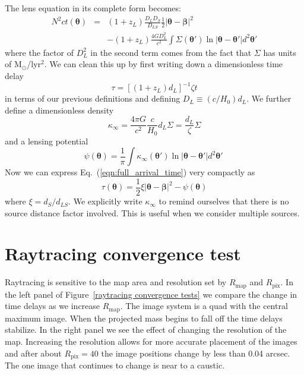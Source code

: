 \documentclass[galley,usenatbib]{mn2e}
\newcommand{\Rmap}{\ensuremath{R_\mathrm{map}}}
\newcommand{\Rpix}{\ensuremath{R_\mathrm{pix}}}
\newcommand{\Msun}{\ensuremath{\mathrm{M}_\odot}}
\newcommand{\figref}[1] {Figure~\ref{#1}}
\newcommand{\eqnref}[1] {Eq.~(\ref{#1})}
\renewcommand{\vec}[1]{\ensuremath{\boldsymbol{#1}}}
\begin{document}
The lens equation in its complete form becomes:
%
\begin{eqnarray}
N^2ct(\vec\theta) & = & (1+z_L)\frac{D_{L}D_{S}}{D_{LS}}\frac12 |\vec\theta - \vec\beta|^2 \nonumber \\
& & - (1+z_L)\frac{4GD_{L}^2}{c^2}\int \Sigma(\vec\theta') \ln |\vec\theta-\vec\theta'| d^2\vec\theta'
\label{eqn:full_arrival_time}
\end{eqnarray}
%
where the factor of $D_L^2$ in the second term comes from the fact that $\Sigma$
has units of \Msun/lyr$^2$. We can clean this up by first writing down a dimensionless time
delay
%
\begin{equation}
\tau = \left[ (1+z_L) d_L\right]^{-1}\zeta t
\label{tau}
\end{equation}
%
in terms of our previous definitions and defining $D_L \equiv (c/H_0)d_L$. We
further define a dimensionless density
%
\begin{equation}
\kappa_\infty = \frac{4\pi G}{c^2}\frac{c}{H_0}d_L\Sigma
              = \frac{d_L}{\zeta}\Sigma
\end{equation}
%
and a lensing potential
%
\begin{equation}
\psi(\vec\theta) = \frac1\pi \int \kappa_\infty(\vec\theta') \ln|\vec\theta - \vec\theta'| d^2\vec\theta'\
\label{lensing potential}
\end{equation}
%
Now we can express \eqnref{eqn:full_arrival_time} very compactly as
%
\begin{equation}
\tau(\vec\theta) = \frac12 \xi |\vec\theta-\vec\beta|^2 - \psi(\vec\theta)
\label{arrival time}
\end{equation}
%
where $\xi=d_S / d_{LS}$.
We explicitly write $\kappa_\infty$ to remind ourselves
that there is no source distance factor involved. This is useful when we
consider multiple sources.

\section{Raytracing convergence test}
Raytracing is sensitive to the map area and resolution set by $\Rmap$ and
$\Rpix$.  In the left panel of \figref{raytracing convergence tests} we compare
the change in time delays as we increase $\Rmap$.  The image system is a quad
with the central maximum image. When the projected mass begins to fall off the
time delays stabilize. In the right panel we see the effect of changing the
resolution of the map.  Increasing the resolution allows for more accurate
placement of the images and after about $\Rpix=40$ the image positions change
by less than 0.04 arcsec. The one image that continues to change is near to a
caustic.  
\end{document}
